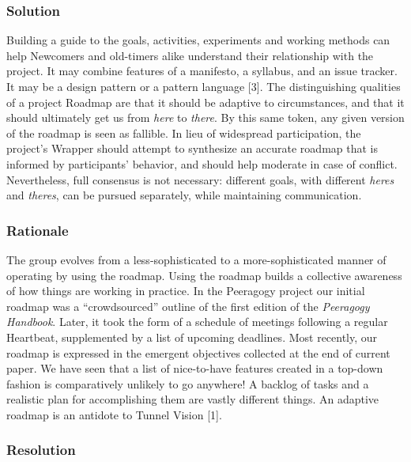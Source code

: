 \hypertarget{solution}{%
\subsubsection{Solution}\label{solution}}

Building a guide to the goals, activities, experiments and working
methods can help {{Newcomers}} and old-timers alike understand their
relationship with the project. It may combine features of a manifesto, a
syllabus, and an issue tracker. It may be a design pattern or a pattern
language {{[}3{]}}. The distinguishing qualities of a project Roadmap
are that it should be adaptive to circumstances, and that it should
ultimately get us from \emph{here} to \emph{there}. By this same token,
any given version of the roadmap is seen as fallible. In lieu of
widespread participation, the project's {{Wrapper}} should attempt to
synthesize an accurate roadmap that is informed by participants'
behavior, and should help moderate in case of conflict. Nevertheless,
full consensus is not necessary: different goals, with different
\emph{heres} and \emph{theres}, can be pursued separately, while
maintaining communication.

\hypertarget{rationale}{%
\subsubsection{Rationale}\label{rationale}}

The group evolves from a less-sophisticated to a more-sophisticated
manner of operating by using the roadmap. Using the roadmap builds a
collective awareness of how things are working in practice. In the
Peeragogy project our initial roadmap was a ``crowdsourced'' outline of
the first edition of the \emph{Peeragogy Handbook}. Later, it took the
form of a schedule of meetings following a regular {{Heartbeat}},
supplemented by a list of upcoming deadlines. Most recently, our roadmap
is expressed in the emergent objectives collected at the end of current
paper. We have seen that a list of nice-to-have features created in a
top-down fashion is comparatively unlikely to go anywhere! A backlog of
tasks and a realistic plan for accomplishing them are vastly different
things. An adaptive roadmap is an antidote to {{Tunnel Vision}}
{{[}1{]}}.

\hypertarget{resolution}{%
\subsubsection{Resolution}\label{resolution}}

